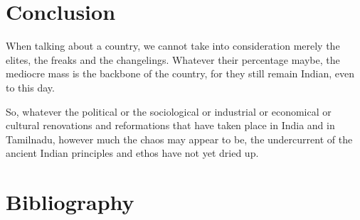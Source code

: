 \section*{Conclusion}

\vskip -5pt

When talking about a country, we cannot take into consideration merely the elites, the freaks and the changelings. Whatever their percentage maybe, the mediocre mass is the backbone of the country, for they still remain Indian, even to this day.

So, whatever the political or the sociological or industrial or economical or cultural renovations and reformations that have taken place in India and in Tamilnadu, however much the chaos may appear to be, the undercurrent of the ancient Indian principles and ethos have not yet dried up.


\section*{Bibliography}


